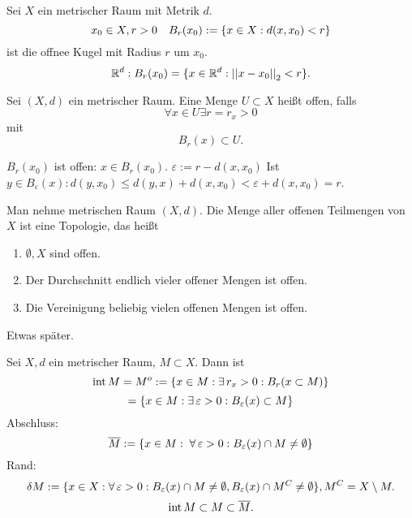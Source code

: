 \documentclass[../ana2.tex]{subfiles}
\begin{document}
\begin{defi}
    Sei \(X\) ein metrischer Raum mit Metrik \(d\).
    \[ x_0 \in X, r > 0 \quad B_r(x_0) 
    := \{ x\in X: d(x, x_0) < r \} \] 
    ist die offnee Kugel mit Radius \(r\) um \(x_0\).
    \[ \mathbb{R}^d: B_r(x_0) = \{x \in \mathbb{R}^d: 
    \left|\left|x - x_0\right|\right|_2 < r\}. \]
\end{defi}
\begin{defi}
    Sei \( (X,d) \) ein metrischer Raum. Eine Menge 
    \( U \subset X \) heißt offen, falls 
    \[ \forall x\in U \exists r = r_x > 0 \]
    mit 
    \[ B_r(x) \subset U. \]
\end{defi}
\begin{bsp}
    \( B_r(x_0) \) ist offen: 
    \( x \in B_r(x_0) \).
    \( \varepsilon := r - d(x, x_0) \)
    Ist \( y \in B_\varepsilon(x): d(y, x_0) 
    \leq d(y, x) + d(x, x_0) < \varepsilon 
    + d(x, x_0) = r \).
\end{bsp}
\begin{satz}[Topologie]
    Man nehme metrischen Raum \( (X, d) \).
    Die Menge aller offenen Teilmengen von \(X\) 
    ist eine Topologie, das heißt
    \begin{enumerate}[label=(\alph*)]
        \item \( \emptyset, X \) sind offen.
        \item Der Durchschnitt endlich vieler
        offener Mengen ist offen.
        \item Die Vereinigung beliebig vielen offenen
        Mengen ist offen. 
    \end{enumerate}    
\end{satz}
\begin{bew}
    Etwas später.
\end{bew}
\begin{defi}
    Sei \( X, d \) ein metrischer Raum, \( M \subset X \).
    Dann ist 
    \[ \inner M = M^o 
    := \set{x \in M: \exists r_x > 0: B_r(x \subset M)}\]
    \[= \set{x \in M: \exists \varepsilon > 0: 
    B_\varepsilon(x) \subset M }\]
    Abschluss:
    \[ \overline{M} := 
    \set{x \in M: \; \forall \varepsilon > 0: 
    B_\varepsilon(x) \cap M \neq \emptyset} \]
    Rand: 
    \[ \delta M := \set{ x \in X: \forall \varepsilon > 0: 
    B_\varepsilon(x) \cap M \neq \emptyset, 
    B_\varepsilon(x) \cap M^C \neq \emptyset },
    M^C = X \setminus M. \]
    \[ \operatorname{int} M \subset M \subset \overline{M}. \]
\end{defi}
\end{document}
